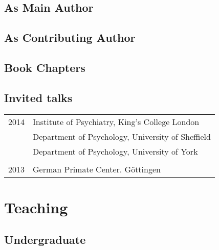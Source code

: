 \documentclass[11pt]{article}
\begin{document}
\nocite{*}

\setlength\bibhang{0pt}

\printbibliography[type=article,keyword=lead,heading=none]

\subsection*{As Main Author}

\printbibliography[type=article,keyword=main,heading=none]

\subsection*{As Contributing Author}

\printbibliography[type=article,keyword=contrib,heading=none]

\subsection*{Book Chapters}

\printbibliography[type=inbook,heading=none]

\subsection*{Invited talks}

\begin{tabular}{p{3cm}p{12cm}}
	
2014 & Institute of Psychiatry, King's College London \\

     & Department of Psychology, University of Sheffield \\

    & Department of Psychology, University of York \\ \\

2013 & German Primate Center. Göttingen

\end{tabular}


\section*{Teaching}

\subsection*{Undergraduate}
\end{document}
